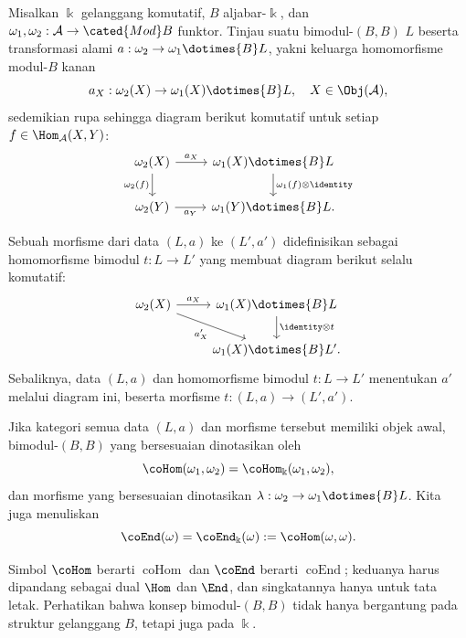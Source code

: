 \begin{definition}\label{def:cogebra-L-universal}
	Misalkan $\Bbbk$ gelanggang komutatif, $B$ aljabar-$\Bbbk$, dan
	$\omega_1,\omega_2:\mathcal{A}\to\cated{Mod}B$ funktor. Tinjau suatu
	bimodul-$(B,B)$ $L$ beserta transformasi alami
	$a:\omega_2\to\omega_1\dotimes{B}L$, yakni keluarga homomorfisme
	modul-$B$ kanan
	\[ a_X: \omega_2(X) \to \omega_1(X) \dotimes{B} L, \quad X \in \Obj(\mathcal{A}), \]
	sedemikian rupa sehingga diagram berikut komutatif untuk setiap
	$f\in\Hom_{\mathcal{A}}(X,Y)$:
	\[\begin{tikzcd}
		\omega_2(X) \arrow[r, "a_X"] \arrow[d, "{\omega_2(f)}"'] & \omega_1(X) \dotimes{B} L \arrow[d, "{\omega_1(f) \otimes \identity}"] \\
		\omega_2(Y) \arrow[r, "a_Y"'] & \omega_1(Y) \dotimes{B} L.
	\end{tikzcd}\]

	Sebuah morfisme dari data $(L,a)$ ke $(L',a')$ didefinisikan sebagai
	homomorfisme bimodul $t:L\to L'$ yang membuat diagram berikut selalu
	komutatif:
	\[\begin{tikzcd}
		\omega_2(X) \arrow[r, "{a_X}"] \arrow[rd, "{a'_X}"'] & \omega_1(X) \dotimes{B} L \arrow[d, "{\identity \otimes t}"] \\
		& \omega_1(X) \dotimes{B} L'.
	\end{tikzcd}\]
	Sebaliknya, data $(L,a)$ dan homomorfisme bimodul $t:L\to L'$
	menentukan $a'$ melalui diagram ini, beserta morfisme
	$t:(L,a)\to(L',a')$.

	Jika kategori semua data $(L,a)$ dan morfisme tersebut memiliki objek
	awal, bimodul-$(B,B)$ yang bersesuaian dinotasikan oleh
	\[ \coHom(\omega_1, \omega_2) = \coHom_{\Bbbk}(\omega_1, \omega_2), \]
	dan morfisme yang bersesuaian dinotasikan
	$\lambda:\omega_2\to\omega_1\dotimes{B}L$. Kita juga menuliskan
	\[ \coEnd(\omega) = \coEnd_{\Bbbk}(\omega) := \coHom(\omega, \omega). \]
\end{definition}

Simbol $\coHom$ berarti $\operatorname{coHom}$ dan $\coEnd$ berarti
$\operatorname{coEnd}$; keduanya harus dipandang sebagai dual $\Hom$ dan
$\End$, dan singkatannya hanya untuk tata letak. Perhatikan bahwa konsep
bimodul-$(B,B)$ tidak hanya bergantung pada struktur gelanggang $B$, tetapi
juga pada $\Bbbk$.

